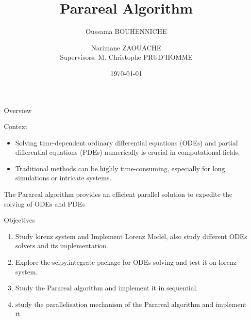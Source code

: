 \documentclass[aspectratio=169,xcolor=dvipsnames, t]{beamer}
\title[Parareal Algorithm]{Parareal Algorithm}
\author[O. BOUHENNICHE \and N. ZAOUACHE]{Oussama BOUHENNICHE \and Narimane ZAOUACHE \\[5mm]{\small Supervisors: M. Christophe PRUD’HOMME}}
\institute[]{University of Strasbourg}
\date{\today} %
\begin{document}
\maketitlepage

\begin{frame}[t]{Overview}
    \tableofcontents
\end{frame}


\begin{frame}{Context}
    \begin{itemize}
        \item Solving time-dependent ordinary differential equations (ODEs) and partial differential equations (PDEs) numerically is crucial in computational fields.
        \item Traditional methods can be highly time-consuming, especially for long simulations or intricate systems.
    \end{itemize}
\begin{block}{}
    The Parareal algorithm provides an efficient parallel solution to expedite the solving of ODEs and PDEs
\end{block}
\end{frame}

\begin{frame}{Objectives}
    \begin{enumerate}
        \item Study lorenz system and Implement Lorenz Model, also study different ODEs solvers and its implementation.
        \item Explore the scipy.integrate package for ODEs solving and test it on lorenz system.
        \item Study the Parareal algorithm and implement it in sequential.
        \item study the parallelisation mechanism of the Parareal algorithm and implement it.
    \end{enumerate}
\end{frame}

\end{document}
